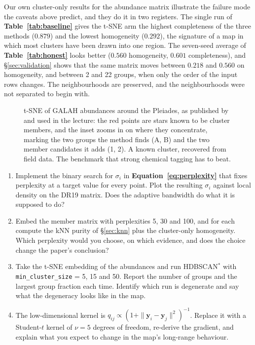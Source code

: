 Our own cluster-only results for the abundance matrix illustrate the failure
mode the caveats above predict, and they do it in two registers. The single run
of \textbf{Table~\ref{tab:baseline}} gives the t-SNE arm the highest
completeness of the three methods ($0.879$) and the lowest homogeneity
($0.292$), the signature of a map in which most clusters have been drawn into
one region. The seven-seed average of \textbf{Table~\ref{tab:honest}} looks
better ($0.560$ homogeneity, $0.601$ completeness), and \S\ref{sec:validation}
shows that the same matrix moves between $0.218$ and $0.560$ on homogeneity,
and between 2 and 22 groups, when only the order of the input rows changes. The
neighbourhoods are preserved, and the neighbourhoods were not separated to
begin with.

\begin{figure}[htbp]\centering
  \caption{t-SNE of GALAH abundances around the Pleiades, as published by
  \citet{Kos:17} and used in the lecture: the red points are stars known to be
  cluster members, and the inset zooms in on where they concentrate, marking
  the two groups the method finds (A, B) and the two member candidates it adds
  (1, 2). A known cluster, recovered from field data. The benchmark that strong
  chemical tagging has to beat.}
  \label{fig:kostse}
\end{figure}

\begin{issues}[EXERCISES]
\begin{enumerate}
\item Implement the binary search for $\sigma_i$ in
  \textbf{Equation~\ref{eq:perplexity}} that fixes perplexity at a target
  value for every point. Plot the resulting $\sigma_i$ against local density
  on the DR19 matrix. Does the adaptive bandwidth do what it is supposed to
  do?
\item Embed the member matrix with perplexities 5, 30 and 100, and for each
  compute the kNN purity of \S\ref{sec:knn} plus the cluster-only homogeneity.
  Which perplexity would you choose, on which evidence, and does the choice
  change the paper's conclusion?
\item Take the t-SNE embedding of the abundances and run HDBSCAN$^*$ with
  \texttt{min\_cluster\_size} = 5, 15 and 50. Report the number of groups and
  the largest group fraction each time. Identify which run is degenerate and
  say what the degeneracy looks like in the map.
\item The low-dimensional kernel is $q_{ij} \propto (1 +
  \|\mathbf{y}_i-\mathbf{y}_j\|^2)^{-1}$. Replace it with a Student-$t$ kernel
  of $\nu = 5$ degrees of freedom, re-derive the gradient, and explain what
  you expect to change in the map's long-range behaviour.
\end{enumerate}
\end{issues}
